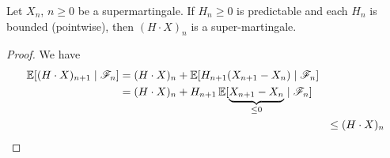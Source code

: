	\begin{theorem}
	  \label{thm:discrete-stochastic-integral-of-a}
		Let $X_n$, $n \geq 0$ be a supermartingale. If $H_n \geq 0$ is predictable and each $H_n$ is bounded (pointwise), then $(H \cdot X)_n$ is a super-martingale. 
	\end{theorem}
	\begin{proof}
	  We have 
		\begin{align}
			\operatorname{\mathbb{E}}[(H \cdot X)_{n+1} \mid \mathscr{F}_n] & = (H \cdot X)_n + \operatorname{\mathbb{E}}[H_{n+1} (X_{n+1} - X_n) \mid \mathscr{F}_n ] \\ 
																											 & = (H \cdot X)_n + H_{n+1} \operatorname{\mathbb{E}}[\underbrace{X_{n+1} - X_n}_{\leq 0} \mid \mathscr{F}_n ] \\ &
																											& \leq (H \cdot X)_n 
		\end{align}
	\end{proof}
